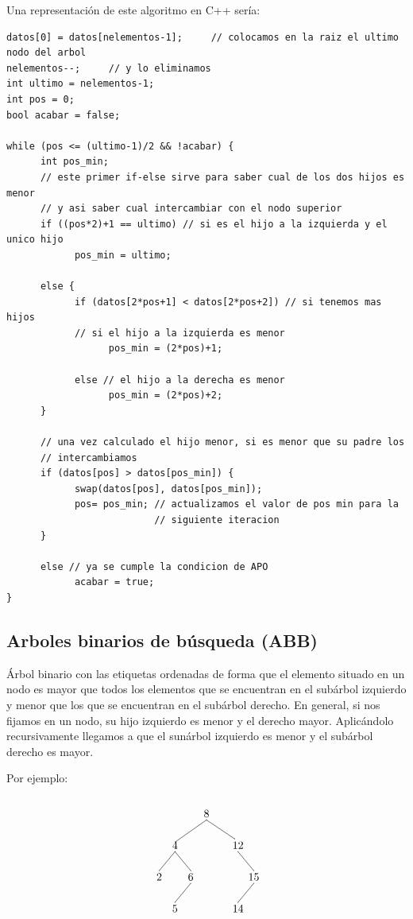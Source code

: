 \documentclass[10pt,a4paper,spanish]{report}
\begin{document}
\noindent
Una representación de este algoritmo en C++ sería:

\begin{verbatim}
datos[0] = datos[nelementos-1];     // colocamos en la raiz el ultimo nodo del arbol
nelementos--;     // y lo eliminamos
int ultimo = nelementos-1;
int pos = 0;
bool acabar = false;

while (pos <= (ultimo-1)/2 && !acabar) {
      int pos_min;
      // este primer if-else sirve para saber cual de los dos hijos es menor
      // y asi saber cual intercambiar con el nodo superior
      if ((pos*2)+1 == ultimo) // si es el hijo a la izquierda y el unico hijo
            pos_min = ultimo;

      else {
            if (datos[2*pos+1] < datos[2*pos+2]) // si tenemos mas hijos
            // si el hijo a la izquierda es menor
                  pos_min = (2*pos)+1;

            else // el hijo a la derecha es menor
                  pos_min = (2*pos)+2;
      }

      // una vez calculado el hijo menor, si es menor que su padre los
      // intercambiamos
      if (datos[pos] > datos[pos_min]) {
            swap(datos[pos], datos[pos_min]);
            pos= pos_min; // actualizamos el valor de pos min para la
                          // siguiente iteracion
      }

      else // ya se cumple la condicion de APO
            acabar = true;
}
\end{verbatim}

\subsection{\textcolor[rgb]{0.3,0.4,0.8}Arboles binarios de búsqueda (ABB)}
\noindent
Árbol binario con las etiquetas ordenadas de forma que el elemento situado en un nodo es mayor que todos los elementos que se encuentran en el subárbol izquierdo y menor que los que se encuentran en el subárbol derecho. En general, si nos fijamos en un nodo, su hijo izquierdo es menor y el derecho mayor. Aplicándolo recursivamente llegamos a que el sunárbol izquierdo es menor y el subárbol derecho es mayor.

\noindent
Por ejemplo:

\[\begin{xy}
,(0,0)*+=<10mm>[]\txt<2cm>{8}
,(-10,-10)*+=<10mm>[]\txt<2cm>{4}
,(10,-10)*+=<10mm>[]\txt<2cm>{12}
,(-15,-20)*+=<10mm>[]\txt<2cm>{2}
,(-5,-20)*+=<10mm>[]\txt<2cm>{6}
,(15,-20)*+=<10mm>[]\txt<2cm>{15}
,(-10,-30)*+=<10mm>[]\txt<2cm>{5}
,(10,-30)*+=<10mm>[]\txt<2cm>{14}

\ar@{-} (0,-2);(-10,-9) %
\ar@{-} (0,-2);(9,-8) %
\ar@{-} (-10,-12);(-15,-18) %
\ar@{-} (10,-12);(15,-18) %
\ar@{-} (-10,-12);(-5,-18) %
\ar@{-} (-5,-22);(-10,-28) %
\ar@{-} (15,-22);(10,-28) %
\end{xy}\]
\end{document}
